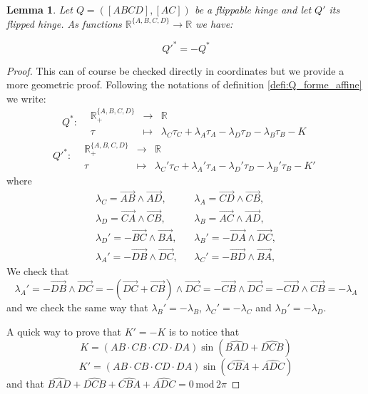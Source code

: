 \documentclass[a4paper,12pt]{article}
\def\RR{\mathbb{R}}
\newcommand{\function}[5]{\displaystyle#1:\begin{array}{l|rcl}
& \displaystyle #2 & \longrightarrow & \displaystyle #3 \\
	& \displaystyle #4 & \longmapsto & \displaystyle #5 \end{array}}
\newtheorem{lem}{Lemma}[section]		 %
\theoremstyle{definition}
\begin{document}
						\begin{lem}\label{lem:inverse_Qstar}
				 Let $Q=([ABCD],[AC])$ be a flippable hinge and let $Q'$ its flipped hinge. 
				 As functions $\RR^{\{A,B,C,D\}}\rightarrow \RR$ we have:
				 
				 $$Q'^*=-Q^* $$
				\end{lem}
				\begin{proof}This can of course be checked directly in coordinates but we provide a more geometric proof.
					Following the notations of definition \ref{defi:Q_forme_affine} we write: 
					$$\function{Q^*}{\RR_+^{\{A,B,C,D\}}}{\RR}{\tau}{
								 \lambda_C\tau_C+
								 \lambda_A\tau_A
									-\lambda_D\tau_D-
									\lambda_B\tau_B-K
								 }$$ $$
					\function{Q'^{*}}{\RR_+^{\{A,B,C,D\}}}{\RR}{\tau}{
								 \lambda_C'\tau_C+
								 \lambda_A'\tau_A
									-\lambda_D'\tau_D-
									\lambda_B'\tau_B-K'
								 }
							$$
				where
							\begin{eqnarray*}
							 \lambda_C=\overrightarrow{AB}\wedge\overrightarrow{AD},&&\lambda_A=\overrightarrow{CD} \wedge\overrightarrow{CB},\\
							 \lambda_D=\overrightarrow{CA}\wedge \overrightarrow{CB},&&\lambda_B=\overrightarrow{AC}\wedge \overrightarrow{AD},\\
							 \lambda_D'=-\overrightarrow{BC}\wedge\overrightarrow{BA},&&\lambda_B'=-\overrightarrow{DA} \wedge\overrightarrow{DC},\\
							 \lambda_A'=-\overrightarrow{DB}\wedge \overrightarrow{DC},&&\lambda_C'=-\overrightarrow{BD}\wedge \overrightarrow{BA},
							\end{eqnarray*}
						We check that
					 $$ \lambda_A'=-\overrightarrow{DB}\wedge \overrightarrow{DC}
					 = -(\overrightarrow{DC}+\overrightarrow{CB})\wedge\overrightarrow{DC}
					 =-\overrightarrow{CB}\wedge \overrightarrow{DC} = -\overrightarrow{CD}\wedge \overrightarrow{CB}
					 = -\lambda_A$$
					 and we check the same way that $\lambda_B'=-\lambda_B$, $\lambda_C'=-\lambda_C$ and $\lambda_D'=-\lambda_D$.
					
					
					A quick way to prove that $K' = -K$ is to notice that 
					$$K = (AB\cdot CB\cdot CD \cdot DA) \sin\left(\widehat{BAD}+\widehat{DCB}\right) $$
					$$K' = (AB\cdot CB\cdot CD \cdot DA) \sin\left(\widehat{CBA}+\widehat{ADC}\right) $$
					and that $\widehat{BAD}+\widehat{DCB}+\widehat{CBA}+\widehat{ADC} = 0\,\mathrm{mod}\, 2\pi$\end{proof}
\end{document}
